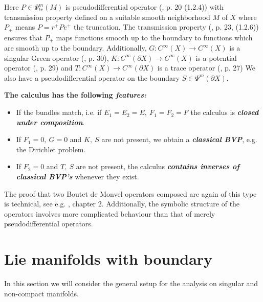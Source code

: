 \documentclass[10pt, reqno]{amsart}
\theoremstyle{definition}
\begin{document}
Here $P \in \Psi_{tr}^m(M)$ is pseudodifferential operator (\cite{G}, p. 20 (1.2.4)) with transmission property defined
on a suitable smooth neighborhood $M$ of $X$ where $P_{+}$ means $P = r^{+} P e^{+}$ the truncation. The transmission property (\cite{G}, p. 23, (1.2.6)) ensures that $P_{+}$ maps functions smooth
up to the boundary to functions which are smooth up to the boundary.
Additionally, $G \colon C^{\infty}(X) \to C^{\infty}(X)$ is a singular Green operator (\cite{G}, p. 30), $K \colon C^{\infty}(\partial X) \to C^{\infty}(X)$ is a potential operator (\cite{G}, p. 29) and $T \colon C^{\infty}(X) \to C^{\infty}(\partial X)$ is a trace operator (\cite{G}, p. 27) 
We also have a pseudodifferential operator on the boundary $S \in \Psi^m(\partial X)$. 

\textbf{The calculus has the following \emph{features:}} 
\begin{itemize}
\item If the bundles match, i.e. if $E_1 = E_2 = E, \ F_1 = F_2 = F$ the calculus is \textbf{\emph{closed under composition}}. 

\item If $F_1 = 0, \ G = 0$ and $K, \ S$ are not present, we obtain a \textbf{\emph{classical BVP}}, e.g. the Dirichlet problem.

\item If $F_2 = 0$ and $T, \ S$ are not present, the calculus \textbf{\emph{contains inverses of classical BVP's}} whenever they exist. 
\end{itemize}

The proof that two Boutet de Monvel operators composed are again of this type is technical, see e.g. \cite{G}, chapter 2. 
Additionally, the symbolic structure of the operators involves more complicated behaviour than that of merely pseudodifferential operators.

\section{Lie manifolds with boundary}

In this section we will consider the general setup for the analysis on singular and non-compact manifolds.
\end{document}
